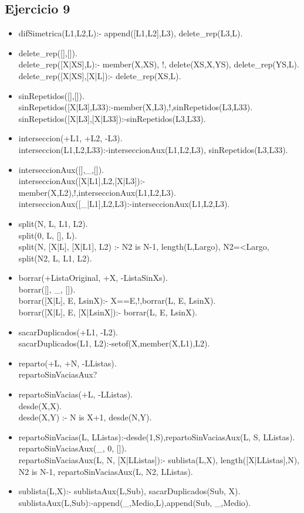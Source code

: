 \documentclass[10pt,a4paper]{article}
\begin{document}
\subsection{Ejercicio 9}
\begin{itemize}
\item difSimetrica(L1,L2,L):- append([L1,L2],L3), delete_rep(L3,L).
\item delete_rep([],[]). \\
delete_rep([X|XS],L):- member(X,XS), !, delete(XS,X,YS), delete_rep(YS,L). \\
delete_rep([X|XS],[X|L]):- delete_rep(XS,L).
\item sinRepetidos([],[]). \\
sinRepetidos([X|L3],L33):-member(X,L3),!,sinRepetidos(L3,L33). \\
sinRepetidos([X|L3],[X|L33]):-sinRepetidos(L3,L33).
\item interseccion(+L1, +L2, -L3). \\
interseccion(L1,L2,L33):-interseccionAux(L1,L2,L3), sinRepetidos(L3,L33).
\item interseccionAux([],_,[]). \\
interseccionAux([X|L1],L2,[X|L3]):-member(X,L2),!,interseccionAux(L1,L2,L3). \\
interseccionAux([_|L1],L2,L3):-interseccionAux(L1,L2,L3).
\item split(N, L, L1, L2). \\
split(0, L, [], L). \\
split(N, [X|L], [X|L1], L2) :- N2 is N-1, length(L,Largo), N2=<Largo, split(N2, L, L1, L2).
\item borrar(+ListaOriginal, +X, -ListaSinXs). \\
borrar([], _, []). \\
borrar([X|L], E, LsinX):- X==E,!,borrar(L, E, LsinX). \\
borrar([X|L], E, [X|LsinX]):- borrar(L, E, LsinX).
\item sacarDuplicados(+L1, -L2). \\
sacarDuplicados(L1, L2):-setof(X,member(X,L1),L2).
\item reparto(+L, +N, -LListas). \\
repartoSinVaciasAux?
\item repartoSinVacias(+L, -LListas). \\
desde(X,X). \\
desde(X,Y) :- N is X+1, desde(N,Y).
\item repartoSinVacias(L, LListas):-desde(1,S),repartoSinVaciasAux(L, S, LListas). \\
repartoSinVaciasAux(_, 0, []). \\
repartoSinVaciasAux(L, N, [X|LListas]):- sublista(L,X), length([X|LListas],N), N2 is N-1, repartoSinVaciasAux(L, N2, LListas).
\item sublista(L,X):- sublistaAux(L,Sub), sacarDuplicados(Sub, X). \\
sublistaAux(L,Sub):-append(_,Medio,L),append(Sub, _,Medio).
\end{itemize}
\end{document}
